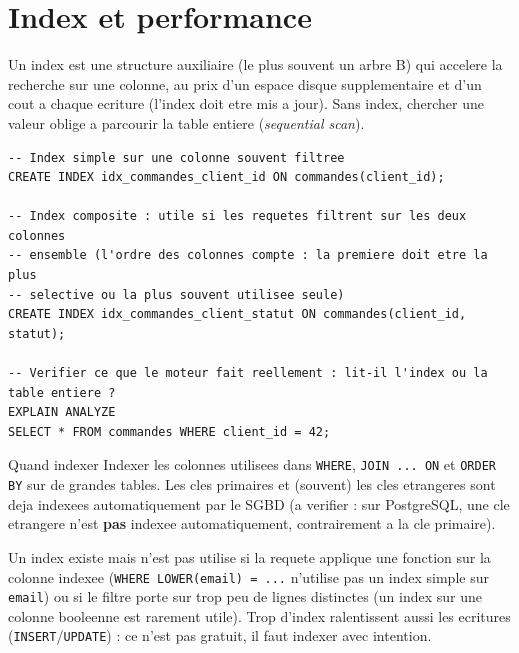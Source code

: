 \documentclass[11pt,a4paper]{article}
\begin{document}
\section{Index et performance}
Un index est une structure auxiliaire (le plus souvent un arbre B) qui accelere
la recherche sur une colonne, au prix d'un espace disque supplementaire et d'un
cout a chaque ecriture (l'index doit etre mis a jour). Sans index, chercher une
valeur oblige a parcourir la table entiere (\emph{sequential scan}).

\begin{lstlisting}
-- Index simple sur une colonne souvent filtree
CREATE INDEX idx_commandes_client_id ON commandes(client_id);

-- Index composite : utile si les requetes filtrent sur les deux colonnes
-- ensemble (l'ordre des colonnes compte : la premiere doit etre la plus
-- selective ou la plus souvent utilisee seule)
CREATE INDEX idx_commandes_client_statut ON commandes(client_id, statut);

-- Verifier ce que le moteur fait reellement : lit-il l'index ou la table entiere ?
EXPLAIN ANALYZE
SELECT * FROM commandes WHERE client_id = 42;
\end{lstlisting}

\begin{infobox}{Quand indexer}
Indexer les colonnes utilisees dans \texttt{WHERE}, \texttt{JOIN ... ON} et
\texttt{ORDER BY} sur de grandes tables. Les cles primaires et (souvent) les
cles etrangeres sont deja indexees automatiquement par le SGBD (a verifier :
sur PostgreSQL, une cle etrangere n'est \textbf{pas} indexee automatiquement,
contrairement a la cle primaire).
\end{infobox}

\begin{piege}
Un index existe mais n'est pas utilise si la requete applique une fonction sur
la colonne indexee (\texttt{WHERE LOWER(email) = ...} n'utilise pas un index
simple sur \texttt{email}) ou si le filtre porte sur trop peu de lignes
distinctes (un index sur une colonne booleenne est rarement utile). Trop
d'index ralentissent aussi les ecritures (\texttt{INSERT}/\texttt{UPDATE}) : ce
n'est pas gratuit, il faut indexer avec intention.
\end{piege}

\end{document}

